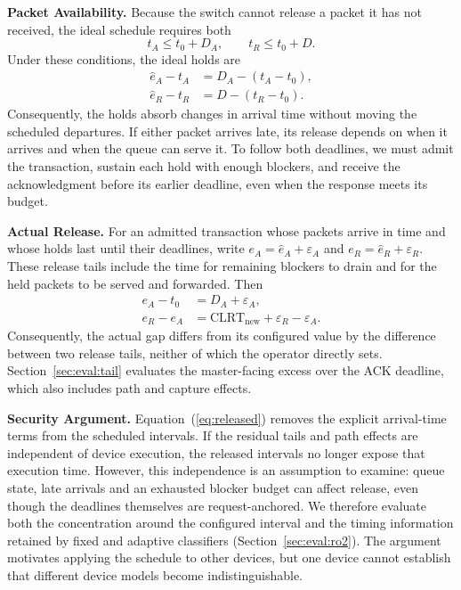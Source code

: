 \textbf{Packet Availability.} Because the switch cannot release a packet it has not received,
the ideal schedule requires both
\begin{equation}
\label{eq:availability}
t_A\leq t_0+D_A, \qquad t_R\leq t_0+D.
\end{equation}
Under these conditions, the ideal holds are
\begin{equation}
\label{eq:coupling}
\begin{aligned}
\hat{e}_A-t_A &= D_A-(t_A-t_0),\\
\hat{e}_R-t_R &= D-(t_R-t_0).
\end{aligned}
\end{equation}
Consequently, the holds absorb changes in arrival time without moving the scheduled departures.
If either packet arrives late, its release depends on when it arrives and when the queue can serve
it. To follow both deadlines, we must admit the transaction, sustain each hold with enough blockers,
and receive the acknowledgment before its earlier deadline, even when the response meets its budget.

\textbf{Actual Release.} For an admitted transaction whose packets arrive in time and whose holds
last until their deadlines, write $e_A=\hat{e}_A+\varepsilon_A$ and
$e_R=\hat{e}_R+\varepsilon_R$. These release tails include the time for remaining blockers to drain
and for the held packets to be served and forwarded. Then
\begin{equation}
\label{eq:released}
\begin{aligned}
e_A-t_0 &= D_A+\varepsilon_A,\\
e_R-e_A &= \mathrm{CLRT}_{\mathrm{new}}+\varepsilon_R-\varepsilon_A.
\end{aligned}
\end{equation}
Consequently, the actual gap differs from its configured value by the difference between two
release tails, neither of which the operator directly sets. Section~\ref{sec:eval:tail} evaluates the
master-facing excess over the ACK deadline, which also includes path and capture effects.

\textbf{Security Argument.} Equation~(\ref{eq:released}) removes the explicit arrival-time terms
from the scheduled intervals. If the residual tails and path effects are independent of device
execution, the released intervals no longer expose that execution time. However, this independence is an assumption to examine: queue state, late arrivals and an exhausted
blocker budget can affect release, even though the deadlines themselves are request-anchored. We therefore evaluate both the concentration around the configured
interval and the timing information retained by fixed and adaptive classifiers
(Section~\ref{sec:eval:ro2}). The argument motivates applying the schedule to other devices, but
one device cannot establish that different device models become indistinguishable.


